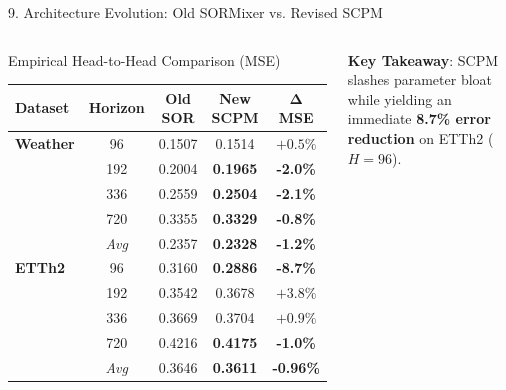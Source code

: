\documentclass[aspectratio=169, 10pt]{beamer}
\begin{document}
\begin{frame}{9. Architecture Evolution: Old SORMixer vs. Revised SCPM}
\begin{columns}[T]
\begin{block}{Empirical Head-to-Head Comparison (MSE)}
\centering
\scriptsize
\setlength{\tabcolsep}{4pt}
\begin{tabular}{lcccc}
\toprule
\textbf{Dataset} & \textbf{Horizon} & \textbf{Old SOR} & \textbf{New SCPM} & $\mathbf{\Delta}$ \textbf{MSE} \\
\midrule
\textbf{Weather} & 96  & 0.1507 & 0.1514 & $+0.5\%$ \\
                 & 192 & 0.2004 & \textbf{0.1965} & \textbf{-2.0\%} \\
                 & 336 & 0.2559 & \textbf{0.2504} & \textbf{-2.1\%} \\
                 & 720 & 0.3355 & \textbf{0.3329} & \textbf{-0.8\%} \\
                 & \textit{Avg} & 0.2357 & \textbf{0.2328} & \textbf{-1.2\%} \\
\midrule
\textbf{ETTh2}   & 96  & 0.3160 & \textbf{0.2886} & \textbf{-8.7\%} \\
                 & 192 & 0.3542 & 0.3678 & $+3.8\%$ \\
                 & 336 & 0.3669 & 0.3704 & $+0.9\%$ \\
                 & 720 & 0.4216 & \textbf{0.4175} & \textbf{-1.0\%} \\
                 & \textit{Avg} & 0.3646 & \textbf{0.3611} & \textbf{-0.96\%} \\
\bottomrule
\end{tabular}
\end{block}
\vspace{-0.2cm}
\footnotesize
\textbf{Key Takeaway}: SCPM slashes parameter bloat while yielding an immediate \textbf{8.7\% error reduction} on ETTh2 ($H=96$).
\end{columns}
\end{frame}
\end{document}
